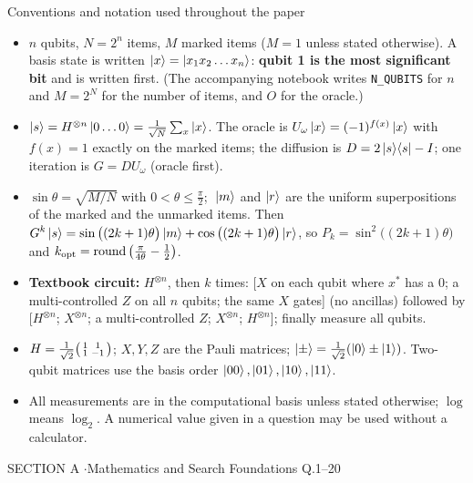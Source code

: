 \documentclass[11pt,a4paper]{article}
\begin{document}
\begin{infobox}{Conventions and notation used throughout the paper}
\small
\begin{itemize}[leftmargin=1.2em, itemsep=1pt, topsep=2pt]
\item $n$ qubits, $N = 2^n$ items, $M$ marked items ($M = 1$ unless stated otherwise). A basis state is written $\ket{x} = \ket{x_1x_2\dots x_n}$:
      \textbf{qubit 1 is the most significant bit} and is written first. (The accompanying notebook writes \texttt{N\_QUBITS} for $n$ and $M = 2^{N}$ for the number of items, and $O$ for the oracle.)
\item $\ket{s} = H^{\otimes n}\ket{0\dots0} = \frac{1}{\sqrt N}\sum_x\ket{x}$. The oracle is $U_\omega\ket{x} = (-1)^{f(x)}\ket{x}$ with $f(x) = 1$ exactly on the marked items; the diffusion is $D = 2\ket{s}\!\bra{s} - I$; one iteration is $G = DU_\omega$ (oracle first).
\item $\sin\theta = \sqrt{M/N}$ with $0 < \theta \le \frac\pi2$; $\;\ket{m}$ and $\ket{r}$ are the uniform superpositions of the marked and the unmarked items. Then
      $\displaystyle G^k\ket{s} = \sin\big((2k+1)\theta\big)\ket{m} + \cos\big((2k+1)\theta\big)\ket{r}$, so $P_k = \sin^2\big((2k+1)\theta\big)$ and
      $k_{\rm opt} = \operatorname{round}\big(\frac{\pi}{4\theta} - \frac12\big)$.
\item \textbf{Textbook circuit:} $H^{\otimes n}$, then $k$ times: [$X$ on each qubit where $x^\ast$ has a $0$; a multi-controlled $Z$ on all $n$ qubits; the same $X$ gates] (no ancillas) followed by [$H^{\otimes n}$; $X^{\otimes n}$; a multi-controlled $Z$; $X^{\otimes n}$; $H^{\otimes n}$]; finally measure all qubits.
\item $H = \frac{1}{\sqrt2}\begin{psmallmatrix}1&1\\1&-1\end{psmallmatrix}$; $X, Y, Z$ are the Pauli matrices; $\ket{\pm} = \frac{1}{\sqrt2}(\ket0 \pm \ket1)$. Two-qubit matrices use the basis order $\ket{00}, \ket{01}, \ket{10}, \ket{11}$.
\item All measurements are in the computational basis unless stated otherwise; $\log$ means $\log_2$. A numerical value given in a question may be used without a calculator.
\end{itemize}
\end{infobox}
\newpage

\begin{sectionbanner}SECTION A \enspace$\cdot$\enspace Mathematics and Search Foundations \hfill Q.1--20\end{sectionbanner}
\end{document}
